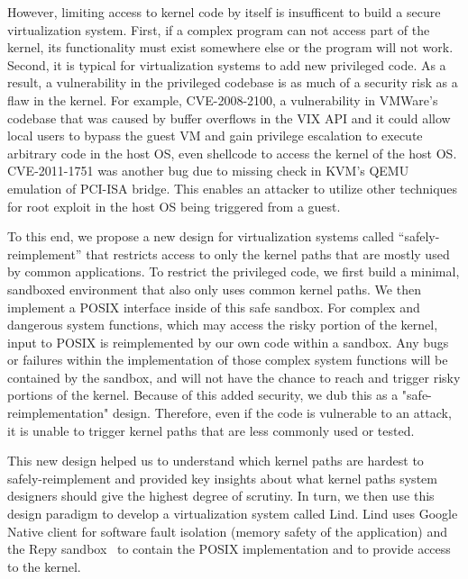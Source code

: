 However, limiting access to kernel code by itself is insufficent to build a secure virtualization system.
First, if a complex program can not access part of the kernel, its functionality
 must exist somewhere else or the program will not work.  Second, it is
typical for virtualization systems to add new privileged code.
As a result, a vulnerability in the privileged codebase is as much of a security
risk as a flaw in the kernel.  %
For example, CVE-2008-2100, a vulnerability in VMWare's codebase that was caused by buffer overflows
in the VIX API and it could allow local users to bypass the guest VM and gain privilege escalation to execute arbitrary code
in the host OS, even shellcode to access the kernel of the host OS. CVE-2011-1751 was another bug due to
missing check in KVM's QEMU emulation of PCI-ISA bridge. This enables an attacker to utilize other techniques \cite{Virtunoid}
for root exploit in the host OS being triggered from a guest.


To this end, we propose a new design for virtualization
systems called ``safely-reimplement'' that restricts access to only the
kernel paths that are mostly used by common applications.  To restrict the privileged
code, we first build a minimal, sandboxed environment that also only uses
common kernel paths.
We then implement a POSIX interface inside of this safe sandbox. For complex and dangerous system functions,
which may access the risky portion of the kernel,
input to POSIX is reimplemented by our own code within a sandbox. Any bugs or failures within the implementation of
those complex system functions
will be contained by the sandbox, and will not have the chance to reach
and trigger risky portions of the kernel. Because of this added security, we dub this as a "safe-reimplementation" design.
Therefore, even if the code
is vulnerable to an attack, it is unable to trigger
kernel paths that are less commonly used or tested.

This new design helped us to understand which kernel paths are hardest to
safely-reimplement and provided key insights about what kernel paths system
designers should give the highest degree of scrutiny.
In turn, we then use this design paradigm to develop
a virtualization system called Lind.
Lind uses Google Native client for software fault isolation (memory
safety of the application) and the Repy sandbox~\cite{Repy-10} to contain the POSIX
implementation and to provide access to the kernel.

